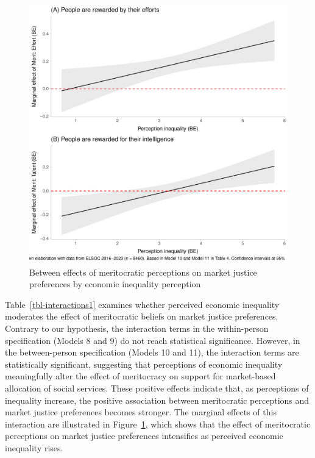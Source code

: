 \documentclass[
  12pt,
]{article}
\begin{document}
\begin{figure}[H]

{\centering \includegraphics[width=1\textwidth,height=\textheight]{paper_files/figure-pdf/fig-interact-1.pdf}

}

\caption{\label{fig-interact}Between effects of meritocratic perceptions
on market justice preferences by economic inequality perception}

\end{figure}

Table~\ref{tbl-interactions1} examines whether perceived economic
inequality moderates the effect of meritocratic beliefs on market
justice preferences. Contrary to our hypothesis, the interaction terms
in the within-person specification (Models 8 and 9) do not reach
statistical significance. However, in the between-person specification
(Models 10 and 11), the interaction terms are statistically significant,
suggesting that perceptions of economic inequality meaningfully alter
the effect of meritocracy on support for market-based allocation of
social services. These positive effects indicate that, as perceptions of
inequality increase, the positive association between meritocratic
perceptions and market justice preferences becomes stronger. The
marginal effects of this interaction are illustrated in
Figure~\ref{fig-interact}, which shows that the effect of meritocratic
perceptions on market justice preferences intensifies as perceived
economic inequality rises.
\end{document}

